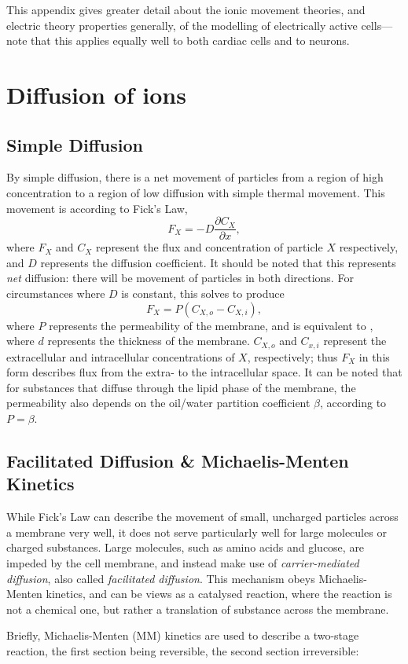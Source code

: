 \documentclass[../thesis-main.tex]{subfiles}
\begin{document}
 This appendix gives greater detail about the ionic movement theories, and electric theory properties generally, of the modelling of electrically active cells---note that this applies equally well to both cardiac cells and to neurons.

 \section{Diffusion of ions}
 \label{sec:ion-diffusion}
 
 \subsection{Simple Diffusion}
 \label{subsec:simple-diff}
 By simple diffusion, there is a net movement of particles from a region of high concentration to a region of low diffusion with simple thermal movement. This movement is according to Fick's Law,
 \begin{equation}
  F_X = -D\frac{\partial C_X}{\partial x},
 \end{equation}
 where $F_X$ and $C_X$ represent the flux and concentration of particle $X$ respectively, and $D$ represents the diffusion coefficient. It should be noted that this represents \emph{net} diffusion: there will be movement of particles in both directions. For circumstances where $D$ is constant, this solves to produce
 \begin{equation}
  F_X = P(C_{X,o}-C_{X,i}),
 \end{equation}
 where $P$ represents the permeability of the membrane, and is equivalent to , where $d$ represents the thickness of the membrane. $C_{X,o}$ and $C_{x,i}$ represent the extracellular and intracellular concentrations of $X$, respectively; thus $F_X$ in this form describes flux from the extra- to the intracellular space. It can be noted that for substances that diffuse through the lipid phase of the membrane, the permeability also depends on the oil/water partition coefficient $\beta$, according to $P = \beta$.
 
 \subsection{Facilitated Diffusion \& Michaelis-Menten Kinetics}
 \label{subsec:facil-diff}
 While Fick's Law can describe the movement of small, uncharged particles across a membrane very well, it does not serve particularly well for large molecules or charged substances. Large molecules, such as amino acids and glucose, are impeded by the cell membrane, and instead make use of \emph{carrier-mediated diffusion}, also called \emph{facilitated diffusion}. This mechanism obeys Michaelis-Menten kinetics, and can be views as a catalysed reaction, where the reaction is not a chemical one, but rather a translation of substance across the membrane.
 
 Briefly, Michaelis-Menten (MM) kinetics are used to describe a two-stage reaction, the first section being reversible, the second section irreversible:
 \begin{equation}
  
 \end{equation}
\end{document}
